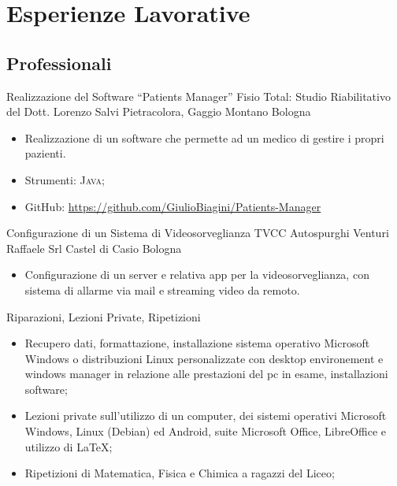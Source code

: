 %
%
%
%
%
%



\section{Esperienze Lavorative}

\subsection{Professionali}

{Realizzazione del Software ``Patients Manager''}
{Fisio Total: Studio Riabilitativo del Dott. Lorenzo Salvi}
{Pietracolora, Gaggio Montano}
{Bologna}
{\begin{itemize}
	\item Realizzazione di un software che permette ad un medico di gestire i
	propri	pazienti.
	\item Strumenti: \textsc{Java};
	\item GitHub: \url{https://github.com/GiulioBiagini/Patients-Manager}
\end{itemize}}

{Configurazione di un Sistema di Videosorveglianza TVCC}
{Autospurghi Venturi Raffaele Srl}
{Castel di Casio}
{Bologna}
{\begin{itemize}
	\item Configurazione di un server e relativa app per la videosorveglianza,
	con sistema di allarme via mail e streaming video da remoto.
\end{itemize}}

{Riparazioni, Lezioni Private, Ripetizioni}
{}
{}
{}
{\begin{itemize}
	\item Recupero dati, formattazione, installazione sistema operativo
	Microsoft Windows o distribuzioni Linux personalizzate con desktop
	environement e windows manager in relazione alle prestazioni del pc in
	esame, installazioni software;
	\item Lezioni private sull'utilizzo di un computer, dei sistemi operativi
	Microsoft Windows, Linux (Debian) ed Android, suite Microsoft Office,
	LibreOffice e utilizzo di \LaTeX;
	\item Ripetizioni di Matematica, Fisica e Chimica a ragazzi del Liceo;
\end{itemize}}



